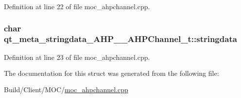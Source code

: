 Definition at line 22 of file moc\+\_\+ahpchannel.\+cpp.

\hypertarget{structqt__meta__stringdata___a_h_p_____a_h_p_channel__t_a211ab5f766a6915f0bf03a64c0691146}{}
\subsubsection[{stringdata}]{\setlength{\rightskip}{0pt plus 5cm}char qt\+\_\+meta\+\_\+stringdata\+\_\+\+A\+H\+P\+\_\+\+\_\+\+A\+H\+P\+Channel\+\_\+t\+::stringdata}\label{structqt__meta__stringdata___a_h_p_____a_h_p_channel__t_a211ab5f766a6915f0bf03a64c0691146}


Definition at line 23 of file moc\+\_\+ahpchannel.\+cpp.



The documentation for this struct was generated from the following file\+:\begin{DoxyCompactItemize}
\item 
Build/\+Client/\+M\+O\+C/\hyperlink{_client_2_m_o_c_2moc__ahpchannel_8cpp}{moc\+\_\+ahpchannel.\+cpp}\end{DoxyCompactItemize}

